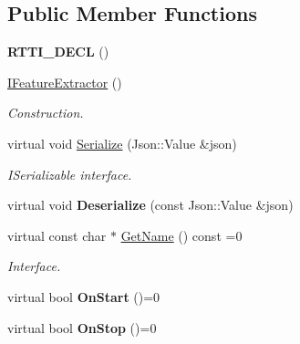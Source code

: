 \subsection*{Public Member Functions}
\begin{DoxyCompactItemize}
\item 
\mbox{\label{class_i_feature_extractor_a5ee07e0f74adca366527106d16bb6c95}} 
{\bfseries R\+T\+T\+I\+\_\+\+D\+E\+CL} ()
\item 
\mbox{\label{class_i_feature_extractor_a0a2542462222862fd47d6bcde5c6ff11}} 
\hyperlink{class_i_feature_extractor_a0a2542462222862fd47d6bcde5c6ff11}{I\+Feature\+Extractor} ()
\begin{DoxyCompactList}\small\item\em Construction. \end{DoxyCompactList}\item 
\mbox{\label{class_i_feature_extractor_a4275525b3455e2fdcc8443be67761b17}} 
virtual void \hyperlink{class_i_feature_extractor_a4275525b3455e2fdcc8443be67761b17}{Serialize} (Json\+::\+Value \&json)
\begin{DoxyCompactList}\small\item\em I\+Serializable interface. \end{DoxyCompactList}\item 
\mbox{\label{class_i_feature_extractor_a1f408a3f75af9d33aabd9dd89e153d1e}} 
virtual void {\bfseries Deserialize} (const Json\+::\+Value \&json)
\item 
\mbox{\label{class_i_feature_extractor_a4e19c597534ff62d7b9ee71431d19cd8}} 
virtual const char $\ast$ \hyperlink{class_i_feature_extractor_a4e19c597534ff62d7b9ee71431d19cd8}{Get\+Name} () const =0
\begin{DoxyCompactList}\small\item\em Interface. \end{DoxyCompactList}\item 
\mbox{\label{class_i_feature_extractor_a969a6d0dad7cddd176aee991b023a929}} 
virtual bool {\bfseries On\+Start} ()=0
\item 
\mbox{\label{class_i_feature_extractor_a690fdffbb0c4f6f35d149c03b5d57a0c}} 
virtual bool {\bfseries On\+Stop} ()=0
\end{DoxyCompactItemize}


